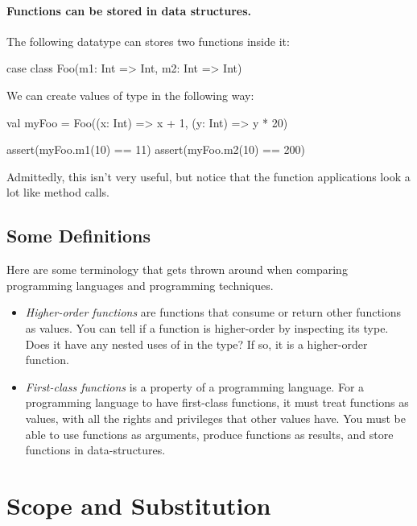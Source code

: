 \documentclass[9pt]{extbook}
\begin{document}
\paragraph{Functions can be stored in data structures.}

The following datatype can stores two functions inside it:
%
\begin{scalacode}
case class Foo(m1: Int => Int, m2: Int => Int)
\end{scalacode}

We can create values of type  in the following way:
%
\begin{scalacode}
val myFoo = Foo((x: Int) => x + 1, (y: Int) => y * 20)

assert(myFoo.m1(10) == 11)
assert(myFoo.m2(10) == 200)
\end{scalacode}
%
Admittedly, this isn't very useful, but notice that the function applications
look a lot like method calls.

\subsection{Some Definitions}

Here are some terminology that gets thrown around when comparing programming
languages and programming techniques.

\begin{itemize}

  \item \emph{Higher-order functions} are functions that consume or return other
  functions as values. You can tell if a function is higher-order by inspecting
  its type. Does it have any nested uses of \scalainline{=>} in the type? If so, it is a higher-order
  function.

  \item \emph{First-class functions} is a property of a programming language. For
  a programming language to have first-class functions, it must treat functions
  as values, with all the rights and privileges that other values have. You must
  be able to use functions as arguments, produce functions as results, and store
  functions in data-structures.

\end{itemize}

\section{Scope and Substitution}
\end{document}
